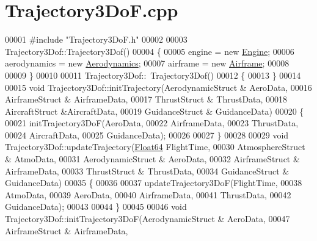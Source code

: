 \hypertarget{_trajectory3_do_f_8cpp_source}{}\section{Trajectory3\+Do\+F.\+cpp}
\label{_trajectory3_do_f_8cpp_source}

\begin{DoxyCode}
00001 \textcolor{preprocessor}{#include "Trajectory3DoF.h"}
00002 
00003 Trajectory3Dof::Trajectory3Dof()
00004 \{
00005     engine       = \textcolor{keyword}{new} \hyperlink{group___engine_class_engine}{Engine};
00006     aerodynamics = \textcolor{keyword}{new} \hyperlink{group___aerodynamic_class_aerodynamics}{Aerodynamics};
00007     airframe     = \textcolor{keyword}{new} \hyperlink{group___airframe_class_airframe}{Airframe};
00008 
00009 \}
00010 
00011 Trajectory3Dof::~Trajectory3Dof()
00012 \{
00013 \}
00014 
00015 \textcolor{keywordtype}{void} Trajectory3Dof::initTrajectory(AerodynamicStruct & AeroData,
00016                                           AirframeStruct & AirframeData,
00017                                           ThrustStruct & ThrustData,
00018                                           AircraftStruct &AircraftData,
00019                                           GuidanceStruct & GuidanceData)
00020 \{
00021     initTrajectory3DoF(AeroData,
00022                         AirframeData,
00023                         ThrustData,
00024                         AircraftData,
00025                         GuidanceData);
00026 
00027 \}
00028 
00029 \textcolor{keywordtype}{void} Trajectory3Dof::updateTrajectory(\hyperlink{group___tools_ga3f1431cb9f76da10f59246d1d743dc2c}{Float64} FlightTime,
00030                                     AtmosphereStruct & AtmoData,
00031                                     AerodynamicStruct & AeroData,
00032                                     AirframeStruct & AirframeData,
00033                                     ThrustStruct & ThrustData,
00034                                     GuidanceStruct & GuidanceData)
00035 \{
00036 
00037     updateTrajectory3DoF(FlightTime,
00038                         AtmoData,
00039                         AeroData,
00040                         AirframeData,
00041                         ThrustData,
00042                         GuidanceData);
00043         
00044 \}
00045 
00046 \textcolor{keywordtype}{void} Trajectory3Dof::initTrajectory3DoF(AerodynamicStruct & AeroData, 
00047                                         AirframeStruct & AirframeData, 

\end{DoxyCode}
